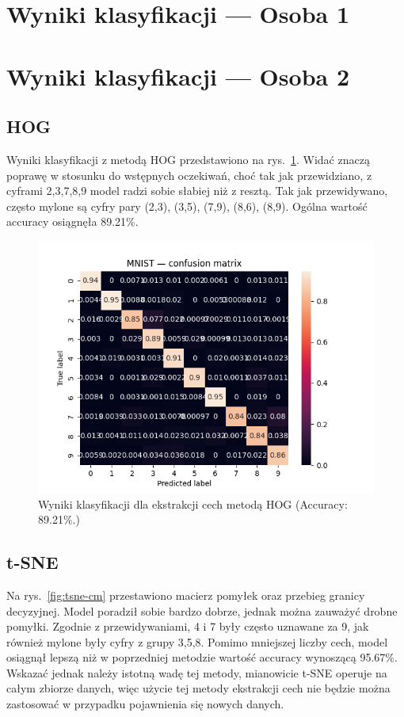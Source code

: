 \documentclass[10pt]{article}
\begin{document}
\pagebreak

\section{Wyniki klasyfikacji --- Osoba 1}
\pagebreak

\section{Wyniki klasyfikacji --- Osoba 2}

\subsection{HOG}

Wyniki klasyfikacji z metodą HOG przedstawiono na rys.~\ref{fig:hog-cm}.
Widać znaczą poprawę w stosunku do wstępnych oczekiwań, choć tak jak przewidziano, z cyframi 2,3,7,8,9 model radzi sobie słabiej niż z resztą.
Tak jak przewidywano, często mylone są cyfry pary (2,3), (3,5), (7,9), (8,6), (8,9).
Ogólna wartość accuracy osiągnęła 89.21\%.

\begin{figure}[H]
    \centering
    \includegraphics[width=.6\linewidth]{img/mnist_hog_cm.png}
    \caption{Wyniki klasyfikacji dla ekstrakcji cech metodą HOG (Accuracy: 89.21\%.)}\label{fig:hog-cm}
\end{figure}

\subsection{t-SNE}

Na rys.~\ref{fig:tsne-cm} przestawiono macierz pomyłek oraz przebieg granicy decyzyjnej.
Model poradził sobie bardzo dobrze, jednak można zauważyć drobne pomyłki.
Zgodnie z przewidywaniami, 4 i 7 były często uznawane za 9, jak również mylone były cyfry z grupy 3,5,8.
Pomimo mniejszej liczby cech, model osiągnął lepszą niż w poprzedniej metodzie wartość accuracy wynoszącą 95.67\%.
Wskazać jednak należy istotną wadę tej metody, mianowicie t-SNE operuje na całym zbiorze danych, więc użycie tej metody 
ekstrakcji cech nie będzie można zastosować w przypadku pojawnienia się nowych danych.
\end{document}
